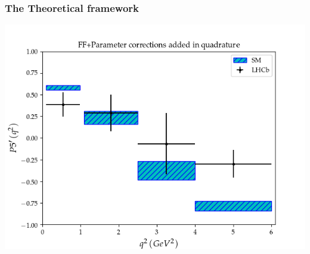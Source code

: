 \documentclass[9pt]{beamer}
\begin{document}
\frame
{
\frametitle{The Theoretical framework}

}




\frame
{
\begin{center}
\includegraphics[scale = .7]{FF.png}
\end{center}
}
\end{document}

